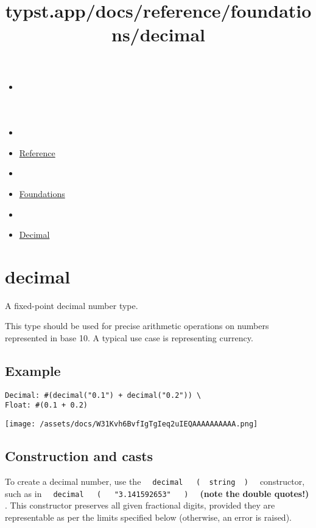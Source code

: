 \title{typst.app/docs/reference/foundations/decimal}

\begin{itemize}
\tightlist
\item
  \href{/docs}{}
\item
  
\item
  \href{/docs/reference/}{Reference}
\item
  
\item
  \href{/docs/reference/foundations/}{Foundations}
\item
  
\item
  \href{/docs/reference/foundations/decimal/}{Decimal}
\end{itemize}

\section{\texorpdfstring{{ decimal }}{ decimal }}\label{summary}

A fixed-point decimal number type.

This type should be used for precise arithmetic operations on numbers
represented in base 10. A typical use case is representing currency.

\subsection{Example}\label{example}

\begin{verbatim}
Decimal: #(decimal("0.1") + decimal("0.2")) \
Float: #(0.1 + 0.2)
\end{verbatim}

\texttt{[image: /assets/docs/W31Kvh6BvfIgTgIeq2uIEQAAAAAAAAAA.png]}

\subsection{Construction and casts}\label{construction-and-casts}

To create a decimal number, use the
\texttt{\ }{\texttt{\ decimal\ }}\texttt{\ }{\texttt{\ (\ }}\texttt{\ string\ }{\texttt{\ )\ }}\texttt{\ }
constructor, such as in
\texttt{\ }{\texttt{\ decimal\ }}\texttt{\ }{\texttt{\ (\ }}\texttt{\ }{\texttt{\ "3.141592653"\ }}\texttt{\ }{\texttt{\ )\ }}\texttt{\ }
\textbf{(note the double quotes!)} . This constructor preserves all
given fractional digits, provided they are representable as per the
limits specified below (otherwise, an error is raised).

